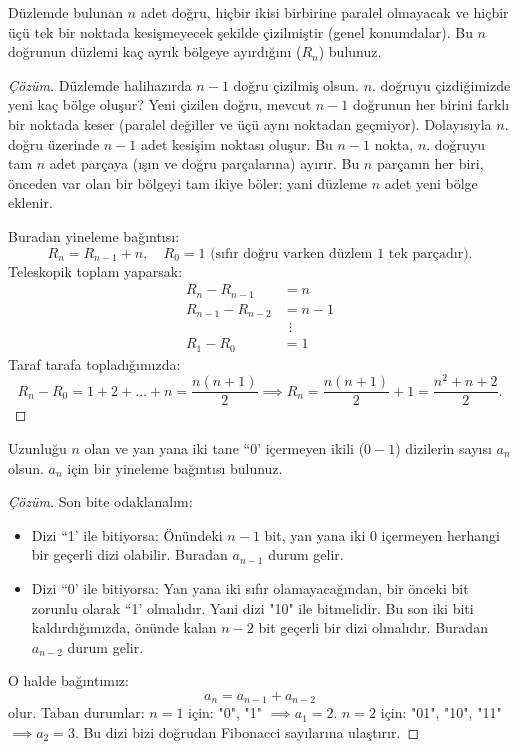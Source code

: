 \begin{example}
Düzlemde bulunan $n$ adet doğru, hiçbir ikisi birbirine paralel olmayacak ve hiçbir üçü tek bir noktada kesişmeyecek şekilde çizilmiştir (genel konumdalar). Bu $n$ doğrunun düzlemi kaç ayrık bölgeye ayırdığını ($R_n$) bulunuz.
\end{example}

\begin{proof}[Çözüm]
Düzlemde halihazırda $n-1$ doğru çizilmiş olsun. $n$. doğruyu çizdiğimizde yeni kaç bölge oluşur? 
Yeni çizilen doğru, mevcut $n-1$ doğrunun her birini farklı bir noktada keser (paralel değiller ve üçü aynı noktadan geçmiyor). Dolayısıyla $n$. doğru üzerinde $n-1$ adet kesişim noktası oluşur.
Bu $n-1$ nokta, $n$. doğruyu tam $n$ adet parçaya (ışın ve doğru parçalarına) ayırır. Bu $n$ parçanın her biri, önceden var olan bir bölgeyi tam ikiye böler; yani düzleme $n$ adet yeni bölge eklenir.

Buradan yineleme bağıntısı:
\[
R_n = R_{n-1} + n, \quad R_0 = 1 \text{ (sıfır doğru varken düzlem 1 tek parçadır)}.
\]
Teleskopik toplam yaparsak:
\begin{align*}
R_n - R_{n-1} &= n \\
R_{n-1} - R_{n-2} &= n-1 \\
&\ \ \vdots \\
R_1 - R_0 &= 1
\end{align*}
Taraf tarafa topladığımızda:
\[
R_n - R_0 = 1 + 2 + \dots + n = \frac{n(n+1)}{2} \implies R_n = \frac{n(n+1)}{2} + 1 = \frac{n^2 + n + 2}{2}.
\]
\end{proof}

\begin{example}
Uzunluğu $n$ olan ve yan yana iki tane ``0' içermeyen ikili ($0-1$) dizilerin sayısı $a_n$ olsun. $a_n$ için bir yineleme bağıntısı bulunuz.
\end{example}

\begin{proof}[Çözüm]
Son bite odaklanalım:
\begin{itemize}
    \item Dizi ``1' ile bitiyorsa: Önündeki $n-1$ bit, yan yana iki 0 içermeyen herhangi bir geçerli dizi olabilir. Buradan $a_{n-1}$ durum gelir.
    \item Dizi ``0' ile bitiyorsa: Yan yana iki sıfır olamayacağından, bir önceki bit zorunlu olarak ``1' olmalıdır. Yani dizi "10" ile bitmelidir. Bu son iki biti kaldırdığımızda, önünde kalan $n-2$ bit geçerli bir dizi olmalıdır. Buradan $a_{n-2}$ durum gelir.
\end{itemize}
O halde bağıntımız:
\[
a_n = a_{n-1} + a_{n-2}
\]
olur. Taban durumlar:
$n=1$ için: "0", "1" $\implies a_1 = 2$.
$n=2$ için: "01", "10", "11" $\implies a_2 = 3$.
Bu dizi bizi doğrudan Fibonacci sayılarına ulaştırır.
\end{proof}

